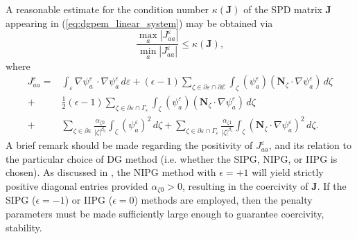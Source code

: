 A reasonable estimate for the condition number $\kappa (\mathbf{J})$ of the SPD matrix $\mathbf{J}$ appearing in (\ref{eq:dgpem_linear_system}) may be obtained via
\begin{equation}
	 \frac{\max_a |J^{\varepsilon}_{aa}|}{\min_a |J^{\varepsilon}_{aa}|} \leq \kappa (\mathbf{J}),
\end{equation}
where
\begin{align}
	J^{\varepsilon}_{aa} = & \int_{\varepsilon} \nabla \psi^{\varepsilon}_{a} \, \cdot \nabla \psi^{\varepsilon}_{a} \, d \varepsilon + (\epsilon-1) \sum_{\zeta \in \partial \varepsilon \cap \partial \mathcal{E}} \int_{\zeta} \left( \psi^{\varepsilon}_a \right) \left( \mathbf{N}_{\zeta} \cdot \nabla \psi^{\varepsilon}_a \right) \, d \zeta \nonumber \\ 
	+ & \frac{1}{2} (\epsilon-1) \sum_{\zeta \in \partial \varepsilon \cap \Gamma_\varepsilon} \int_{\zeta} \left( \psi^{\varepsilon}_a \right) \left( \mathbf{N}_{\zeta} \cdot \nabla \psi^{\varepsilon}_a \right) \, d \zeta \nonumber \\
	+ & \sum_{\zeta \in \partial \varepsilon} \frac{\alpha_{\zeta0}}{|\zeta|^{\beta_0}} \int_{\zeta} \left( \psi_a^{\varepsilon} \right)^2 \, d \zeta + \sum_{\zeta \in \partial \varepsilon \cap \Gamma_\varepsilon} \frac{\alpha_{\zeta1}}{|\zeta|^{\beta_1}} \int_{\zeta} \left( \mathbf{N}_{\zeta} \cdot \nabla \psi^{\varepsilon}_a \right)^2 \, d \zeta.
\end{align}
A brief remark should be made regarding the positivity of $J^\varepsilon_{aa}$, and its relation to the particular choice of DG method (i.e. whether the SIPG, NIPG, or IIPG is chosen). As discussed in \cite{Riviere:08}, the NIPG method with $\epsilon = +1$ will yield strictly positive diagonal entries provided $\alpha_{\zeta0} > 0$, resulting in the coercivity of $\mathbf{J}$. If the SIPG ($\epsilon = -1$) or IIPG ($\epsilon = 0$) methods are employed, then the penalty parameters must be made sufficiently large enough to guarantee coercivity, stability.

